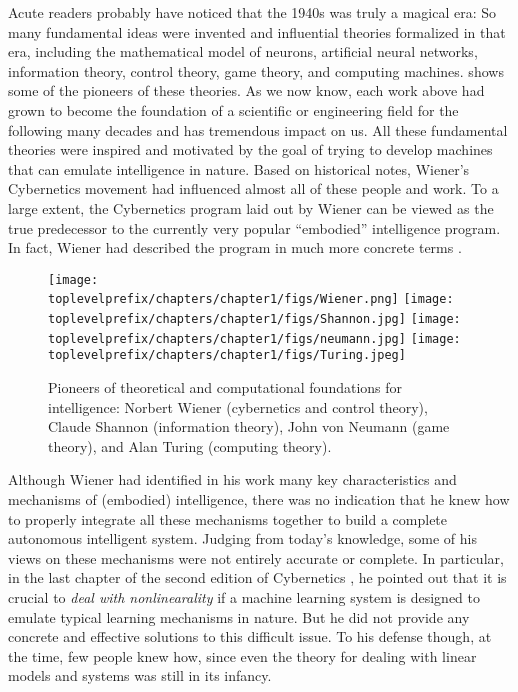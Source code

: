 \documentclass[../../book-main.tex]{subfiles}
\begin{document}
Acute readers probably have noticed that the 1940s was truly a magical era: So many fundamental ideas were invented and influential theories formalized in that era, including the mathematical model of neurons, artificial neural networks, information theory, control theory, game theory, and computing machines.  shows some of the pioneers of these theories. As we now know, each work above had grown to become the foundation of a scientific or engineering field for the following many decades and has tremendous impact on us. All these fundamental theories were inspired and motivated by the goal of trying to develop machines that can emulate intelligence in nature. Based on historical notes, Wiener's Cybernetics movement had influenced almost all of these people and work. To a large extent, the Cybernetics program laid out by Wiener can be viewed as the true predecessor to the currently very popular ``embodied'' intelligence program. In fact, Wiener had described the program in much more concrete terms \cite{Wiener-Cybernetics-1961}. 
\begin{figure}
    \centering
    \texttt{[image: \\toplevelprefix/chapters/chapter1/figs/Wiener.png]}
    \texttt{[image: \\toplevelprefix/chapters/chapter1/figs/Shannon.jpg]}
    \texttt{[image: \\toplevelprefix/chapters/chapter1/figs/neumann.jpg]}
    \texttt{[image: \\toplevelprefix/chapters/chapter1/figs/Turing.jpeg]}
    \caption{Pioneers of theoretical and computational foundations for intelligence: Norbert Wiener (cybernetics and control theory), Claude Shannon (information theory), John von Neumann (game theory), and Alan Turing (computing theory).}
    \label{fig:god-fathers}
\end{figure}

Although Wiener had identified in his work many key characteristics and mechanisms of (embodied) intelligence, there was no indication that he knew how to properly integrate all these mechanisms together to build a complete autonomous intelligent system. Judging from today's knowledge, some of his views on these mechanisms were not entirely accurate or complete. In particular, in the last chapter of the second edition of Cybernetics \cite{Wiener-Cybernetics-1961}, he pointed out that it is crucial to {\em deal with nonlinearality} if a machine learning system is designed to emulate typical learning mechanisms in nature. But he did not provide any concrete and effective solutions to this difficult issue. To his defense though, at the time, few people knew how, since even the theory for dealing with linear models and systems was still in its infancy. 
\end{document}
